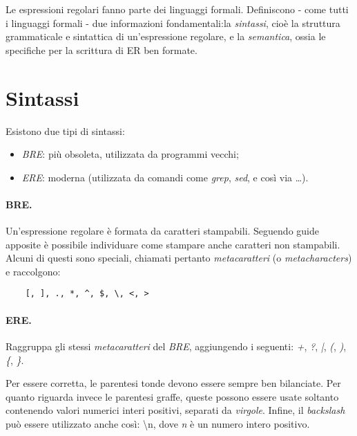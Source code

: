 Le espressioni regolari fanno parte dei linguaggi formali. Definiscono - come tutti i linguaggi formali - due informazioni fondamentali:la \textit{sintassi}, cioè la struttura grammaticale e sintattica di un'espressione regolare, e la \textit{semantica}, ossia le specifiche per la scrittura di ER ben formate.

\section{Sintassi}
Esistono due tipi di sintassi:
\begin{itemize}
	\item \textit{BRE}: più obsoleta, utilizzata da programmi vecchi;
	\item \textit{ERE}: moderna (utilizzata da comandi come \textit{grep}, \textit{sed}, e così via \ldots).
\end{itemize}
\paragraph{BRE.} Un'espressione regolare è formata da caratteri stampabili. Seguendo guide apposite è possibile individuare come stampare anche caratteri non stampabili. Alcuni di questi sono speciali, chiamati pertanto \textit{metacaratteri} (o \textit{metacharacters}) e raccolgono: 
\begin{lstlisting}
	[, ], ., *, ^, $, \, <, >
\end{lstlisting}

\paragraph{ERE.} Raggruppa gli stessi \textit{metacaratteri} del \textit{BRE}, aggiungendo i seguenti: \textit{+}, \textit{?}, \textit{|}, \textit{(}, \textit{)}, \textit{\{}, \textit{\}}. 

Per essere corretta, le parentesi tonde devono essere sempre ben bilanciate. Per quanto riguarda invece le parentesi graffe, queste possono essere usate soltanto contenendo valori numerici interi positivi, separati da \textit{virgole}. Infine, il \textit{backslash} può essere utilizzato anche così: \textbackslash n, dove \textit{n} è un numero intero positivo.

